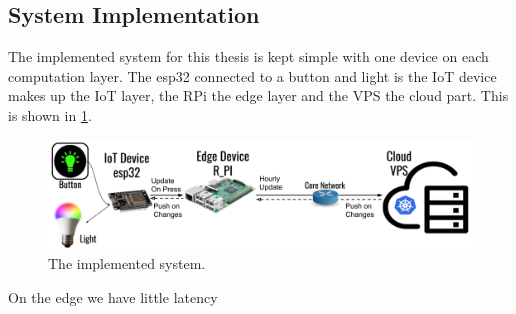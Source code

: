 \subsection{System Implementation}
The implemented system for this thesis is kept simple with one device on each computation layer. The esp32 connected to a button and light is the IoT device makes up the IoT layer, the RPi the edge layer and the VPS the cloud part. This is shown in \cref{fig:actualSetup}.
\begin{figure}
    \centering
    \includegraphics[width=\textwidth]{figures/actualSetup.png}
    \caption{The implemented system.}
    \label{fig:actualSetup}
\end{figure}
On the edge we have little latency 



